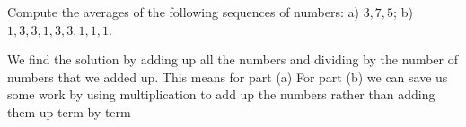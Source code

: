 
Compute the averages of the following sequences of numbers: a) $3,7,5$;  b) $1,3,3,1,3,3,1,1,1$.

\solution
We find the solution by adding up all the numbers and dividing by the number of numbers that we added up. This means for part (a)
For part (b) we can save us some work by using multiplication to add up the numbers rather than adding them up term by term 

